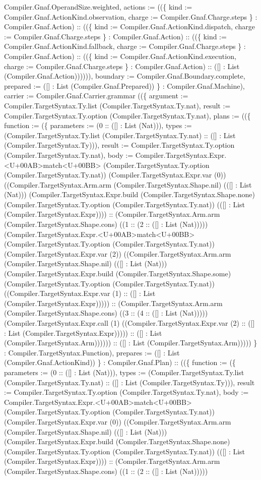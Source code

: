 \documentclass[11pt]{article}
\begin{document}
Compiler.Gnaf.OperandSize.weighted, actions := ((\{ kind := Compiler.Gnaf.ActionKind.observation, charge := Compiler.Gnaf.Charge.steps \} : Compiler.Gnaf.Action) :: ((\{ kind := Compiler.Gnaf.ActionKind.dispatch, charge := Compiler.Gnaf.Charge.steps \} : Compiler.Gnaf.Action) :: ((\{ kind := Compiler.Gnaf.ActionKind.fallback, charge := Compiler.Gnaf.Charge.steps \} : Compiler.Gnaf.Action) :: ((\{ kind := Compiler.Gnaf.ActionKind.execution, charge := Compiler.Gnaf.Charge.steps \} : Compiler.Gnaf.Action) :: ([] : List (Compiler.Gnaf.Action)))))), boundary := Compiler.Gnaf.Boundary.complete, prepared := ([] : List (Compiler.Gnaf.Prepared)) \} : Compiler.Gnaf.Machine), carrier := Compiler.Gnaf.Carrier.grammar ((\{ argument := Compiler.TargetSyntax.Ty.list (Compiler.TargetSyntax.Ty.nat), result := Compiler.TargetSyntax.Ty.option (Compiler.TargetSyntax.Ty.nat), plans := ((\{ function := (\{ parameters := (0 :: ([] : List (Nat))), types := (Compiler.TargetSyntax.Ty.list (Compiler.TargetSyntax.Ty.nat) :: ([] : List (Compiler.TargetSyntax.Ty))), result := Compiler.TargetSyntax.Ty.option (Compiler.TargetSyntax.Ty.nat), body := Compiler.TargetSyntax.Expr.<U+00AB>match<U+00BB> (Compiler.TargetSyntax.Ty.option (Compiler.TargetSyntax.Ty.nat)) (Compiler.TargetSyntax.Expr.var (0)) ((Compiler.TargetSyntax.Arm.arm (Compiler.TargetSyntax.Shape.nil) (([] : List (Nat))) (Compiler.TargetSyntax.Expr.build (Compiler.TargetSyntax.Shape.none) (Compiler.TargetSyntax.Ty.option (Compiler.TargetSyntax.Ty.nat)) (([] : List (Compiler.TargetSyntax.Expr)))) :: (Compiler.TargetSyntax.Arm.arm (Compiler.TargetSyntax.Shape.cons) ((1 :: (2 :: ([] : List (Nat))))) (Compiler.TargetSyntax.Expr.<U+00AB>match<U+00BB> (Compiler.TargetSyntax.Ty.option (Compiler.TargetSyntax.Ty.nat)) (Compiler.TargetSyntax.Expr.var (2)) ((Compiler.TargetSyntax.Arm.arm (Compiler.TargetSyntax.Shape.nil) (([] : List (Nat))) (Compiler.TargetSyntax.Expr.build (Compiler.TargetSyntax.Shape.some) (Compiler.TargetSyntax.Ty.option (Compiler.TargetSyntax.Ty.nat)) ((Compiler.TargetSyntax.Expr.var (1) :: ([] : List (Compiler.TargetSyntax.Expr))))) :: (Compiler.TargetSyntax.Arm.arm (Compiler.TargetSyntax.Shape.cons) ((3 :: (4 :: ([] : List (Nat))))) (Compiler.TargetSyntax.Expr.call (1) ((Compiler.TargetSyntax.Expr.var (2) :: ([] : List (Compiler.TargetSyntax.Expr))))) :: ([] : List (Compiler.TargetSyntax.Arm)))))) :: ([] : List (Compiler.TargetSyntax.Arm))))) \} : Compiler.TargetSyntax.Function), prepares := ([] : List (Compiler.Gnaf.ActionKind)) \} : Compiler.Gnaf.Plan) :: ((\{ function := (\{ parameters := (0 :: ([] : List (Nat))), types := (Compiler.TargetSyntax.Ty.list (Compiler.TargetSyntax.Ty.nat) :: ([] : List (Compiler.TargetSyntax.Ty))), result := Compiler.TargetSyntax.Ty.option (Compiler.TargetSyntax.Ty.nat), body := Compiler.TargetSyntax.Expr.<U+00AB>match<U+00BB> (Compiler.TargetSyntax.Ty.option (Compiler.TargetSyntax.Ty.nat)) (Compiler.TargetSyntax.Expr.var (0)) ((Compiler.TargetSyntax.Arm.arm (Compiler.TargetSyntax.Shape.nil) (([] : List (Nat))) (Compiler.TargetSyntax.Expr.build (Compiler.TargetSyntax.Shape.none) (Compiler.TargetSyntax.Ty.option (Compiler.TargetSyntax.Ty.nat)) (([] : List (Compiler.TargetSyntax.Expr)))) :: (Compiler.TargetSyntax.Arm.arm (Compiler.TargetSyntax.Shape.cons) ((1 :: (2 :: ([] : List (Nat))))) 
\end{document}
